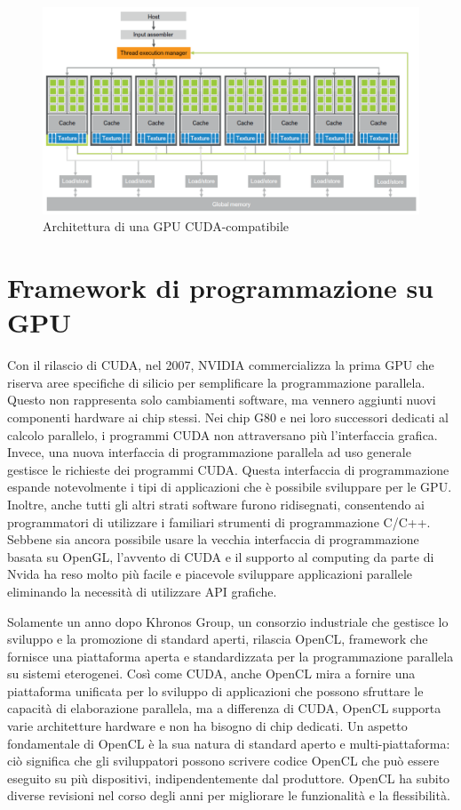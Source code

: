 \begin{figure}[ht]
    \centering
    \includegraphics[width=.9\linewidth]{images/chapter2/cuda_arch.png}
    \caption{Architettura di una GPU CUDA-compatibile}
    \label{fig:cuda_arch}
\end{figure}


\section[Framework di programmazione su GPU]{Framework di programmazione su GPU}


Con il rilascio di CUDA, nel 2007, NVIDIA commercializza la prima GPU che riserva aree specifiche di silicio per semplificare la programmazione parallela. Questo non rappresenta solo cambiamenti software, ma vennero aggiunti nuovi componenti hardware ai chip stessi. Nei chip G80 e nei loro successori dedicati al calcolo parallelo, i programmi CUDA non attraversano più l'interfaccia grafica. Invece, una nuova interfaccia di programmazione parallela ad uso generale gestisce le richieste dei programmi CUDA. Questa interfaccia di programmazione espande notevolmente i tipi di applicazioni che è possibile sviluppare per le GPU. Inoltre, anche tutti gli altri strati software furono ridisegnati, consentendo ai programmatori di utilizzare i familiari strumenti di programmazione C/C++. Sebbene sia ancora possibile usare la vecchia interfaccia di programmazione basata su OpenGL, l'avvento di CUDA e il supporto al computing da parte di Nvida ha reso molto più facile e piacevole sviluppare applicazioni parallele eliminando la necessità di utilizzare API grafiche.

Solamente un anno dopo Khronos Group, un consorzio industriale che gestisce lo sviluppo e la promozione di standard aperti, rilascia OpenCL, framework che fornisce una piattaforma aperta e standardizzata per la programmazione parallela su sistemi eterogenei. Così come CUDA, anche OpenCL mira a fornire una piattaforma unificata per lo sviluppo di applicazioni che possono sfruttare le capacità di elaborazione parallela, ma a differenza di CUDA, OpenCL supporta varie architetture hardware e non ha bisogno di chip dedicati. Un aspetto fondamentale di OpenCL è la sua natura di standard aperto e multi-piattaforma: ciò significa che gli sviluppatori possono scrivere codice OpenCL che può essere eseguito su più dispositivi, indipendentemente dal produttore. OpenCL ha subito diverse revisioni nel corso degli anni per migliorare le funzionalità e la flessibilità. 

